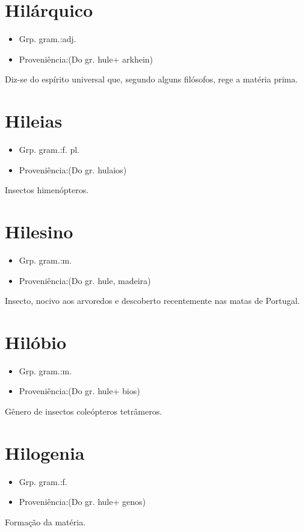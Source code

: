 \documentclass{article}
\begin{document}
\section{Hilárquico}
\begin{itemize}
\item {Grp. gram.:adj.}
\end{itemize}
\begin{itemize}
\item {Proveniência:(Do gr. \textunderscore hule\textunderscore  + \textunderscore arkhein\textunderscore )}
\end{itemize}
Diz-se do espírito universal que, segundo alguns filósofos, rege a matéria prima.
\section{Hileias}
\begin{itemize}
\item {Grp. gram.:f. pl.}
\end{itemize}
\begin{itemize}
\item {Proveniência:(Do gr. \textunderscore hulaios\textunderscore )}
\end{itemize}
Insectos himenópteros.
\section{Hilesino}
\begin{itemize}
\item {Grp. gram.:m.}
\end{itemize}
\begin{itemize}
\item {Proveniência:(Do gr. \textunderscore hule\textunderscore , madeira)}
\end{itemize}
Insecto, nocivo aos arvoredos e descoberto recentemente nas matas de Portugal.
\section{Hilóbio}
\begin{itemize}
\item {Grp. gram.:m.}
\end{itemize}
\begin{itemize}
\item {Proveniência:(Do gr. \textunderscore hule\textunderscore  + \textunderscore bios\textunderscore )}
\end{itemize}
Gênero de insectos coleópteros tetrâmeros.
\section{Hilogenia}
\begin{itemize}
\item {Grp. gram.:f.}
\end{itemize}
\begin{itemize}
\item {Proveniência:(Do gr. \textunderscore hule\textunderscore  + \textunderscore genos\textunderscore )}
\end{itemize}
Formação da matéria.
\end{document}
